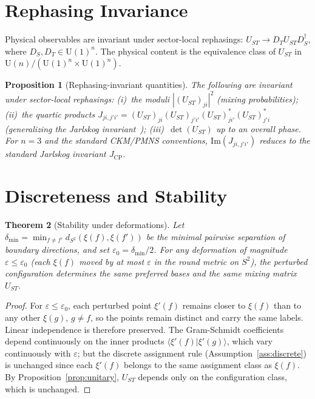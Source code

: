\documentclass[11pt,a4paper]{article}
\newtheorem{theorem}{Theorem}
\newtheorem{proposition}[theorem]{Proposition}
\theoremstyle{definition}
\theoremstyle{remark}
\begin{document}
\section{Rephasing Invariance}

Physical observables are invariant under sector-local rephasings:
$U_{ST}\to D_T U_{ST} D_S^\dagger$, where $D_S,D_T\in\mathrm{U}(1)^n$.
The physical content is the equivalence class of $U_{ST}$ in
$\mathrm{U}(n)/(\mathrm{U}(1)^n\times\mathrm{U}(1)^n)$.

\begin{proposition}[Rephasing-invariant quantities]
The following are invariant under sector-local rephasings:
(i)~the moduli $|(U_{ST})_{ji}|^2$ (mixing probabilities);
(ii)~the quartic products
$J_{ji,j'i'}=(U_{ST})_{ji}(U_{ST})_{j'i'}(U_{ST})^*_{ji'}(U_{ST})^*_{j'i}$
(generalizing the Jarlskog invariant~\cite{Jarlskog});
(iii)~$\det(U_{ST})$ up to an overall phase.
For $n=3$ and the standard CKM/PMNS conventions, $\mathrm{Im}(J_{ji,j'i'})$
reduces to the standard Jarlskog invariant $J_{\mathrm{CP}}$.
\end{proposition}

\section{Discreteness and Stability}

\begin{theorem}[Stability under deformations]
\label{thm:stable}
Let $\delta_{\min}=\min_{f\neq f'}d_{S^2}(\xi(f),\xi(f'))$ be the
minimal pairwise separation of boundary directions, and set
$\varepsilon_0=\delta_{\min}/2$.
For any deformation of magnitude $\varepsilon\leq\varepsilon_0$
(each $\xi(f)$ moved by at most $\varepsilon$ in the round metric
on $S^2$), the perturbed configuration determines the same preferred
bases and the same mixing matrix $U_{ST}$.
\end{theorem}

\begin{proof}
For $\varepsilon\leq\varepsilon_0$, each perturbed point $\xi'(f)$
remains closer to $\xi(f)$ than to any other $\xi(g)$, $g\neq f$,
so the points remain distinct and carry the same labels.
Linear independence is therefore preserved.
The Gram-Schmidt coefficients depend continuously on the inner
products $\langle\xi'(f)|\xi'(g)\rangle$, which vary continuously
with $\varepsilon$; but the discrete assignment rule
(Assumption~\ref{ass:discrete}) is unchanged since each $\xi'(f)$
belongs to the same assignment class as $\xi(f)$.
By Proposition~\ref{prop:unitary}, $U_{ST}$ depends only on the
configuration class, which is unchanged.
\end{proof}
\end{document}
